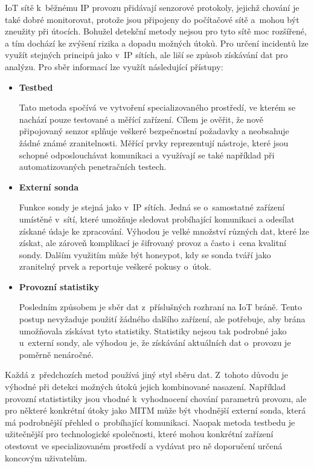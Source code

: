  IoT sítě k~běžnému IP provozu přidávají senzorové protokoly, jejichž chování je také dobré monitorovat, 
 protože jsou připojeny do počítačové sítě a~mohou být zneužity při útocích. Bohužel detekční metody 
 nejsou pro tyto sítě moc rozšířené, a tím dochází ke zvýšení rizika a dopadu možných útoků. Pro určení 
 incidentů lze využít stejných principů jako v~IP sítích, ale liší se způsob získávání dat pro analýzu. 
 Pro sběr informací lze využít následující přístupy:
 \begin{itemize}
  \item \textbf{Testbed}
  
    Tato metoda spočívá ve vytvoření specializovaného prostředí, ve kterém se nachází pouze testované 
    a měřící zařízení. Cílem je ověřit, že nově připojovaný senzor splňuje veškeré bezpečnostní 
    požadavky a neobsahuje žádné známé zranitelnosti. Měřící prvky reprezentují nástroje, které 
    jsou schopné odposlouchávat komunikaci a využívají se také například při automatizovaných
    penetračních testech.   
  \item \textbf{Externí sonda}
  
  Funkce sondy je stejná jako v~IP sítích. Jedná se o~samostatné zařízení umístěné v~sítí, které
  umožňuje sledovat probíhající komunikaci a odesílat získané údaje ke zpracování. 
  Výhodou je velké množství různých  dat, které lze získat, ale zároveň komplikací je šifrovaný provoz
  a často i~cena kvalitní sondy.
  Dalším využitím 
  může být honeypot, kdy se sonda tváří jako zranitelný prvek a reportuje veškeré pokusy o~útok.
    
  \item \textbf{Provozní statistiky}
  
  Posledním způsobem je sběr dat z~příslušných rozhraní na IoT bráně. Tento postup nevyžaduje použití
  žádného dalšího zařízení, ale potřebuje, aby brána umožňovala získávat tyto statistiky. 
  Statistiky nejsou tak podrobné jako u~externí sondy, ale výhodou je, 
  že získávání aktuálních dat o~provozu je poměrně nenáročné.
 \end{itemize}
 
 Každá z~předchozích metod používá jiný styl sběru dat. Z~tohoto důvodu je výhodné při
 detekci možných útoků jejich kombinované nasazení. Například provozní statististiky jsou vhodné
 k~vyhodnocení chování parametrů provozu, ale pro některé konkrétní útoky jako MITM může být vhodnější
 externí sonda, která má podrobnější přehled o~probíhající komunikaci. Naopak metoda testbedu je
 užitečnější
 pro technologické společnosti, které mohou konkrétní zařízení otestovat ve specializovaném prostředí
 a vydávat pro ně doporučení určená koncovým uživatelům.

